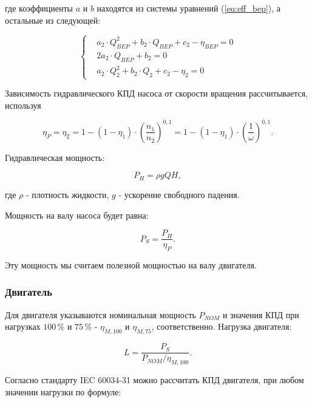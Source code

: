 \documentclass[a4paper, 12pt]{article}
\begin{document}
\noindent где коэффициенты \(a\) и \(b\) находятся из системы уравнений (\ref{eq:eff_bep}), а
остальные из следующей:

\begin{equation}
    \left\{
    \begin{aligned}
            &a_2 \cdot Q^2_{BEP} + b_2 \cdot Q_{BEP} + c_2 - \eta_{BEP} = 0 \\
            &2a_2 \cdot Q_{BEP} + b_2 = 0 \\
            &a_2 \cdot Q^2_2 + b_2 \cdot Q_2 + c_2 - \eta_2 = 0
	\end{aligned}
    \right.
\end{equation}

\noindent Зависимость гидравлического КПД насоса от скорости вращения рассчитывается, используя \cite{Sárbu}

\begin{equation}
	\eta_P = \eta_2 = 1 - (1 - \eta_1) \cdot \left(\frac{n_1}{n_2}\right)^{0,1} = 1 - (1 - \eta_1) \cdot \left(\frac{1}{\omega}\right)^{0,1}.
\end{equation}

    Гидравлическая мощность:

\begin{equation}
	P_H = \rho gQH,
\end{equation}

\noindent где $\rho$ - плотность жидкости, $g$ - ускорение свободного падения.

Мощность на валу насоса будет равна:

\begin{equation}
	P_S = \frac{P_H}{\eta_P}.
\end{equation}

\noindent Эту мощность мы считаем полезной мощностью на валу двигателя.

\subsubsection{Двигатель}

Для двигателя указываются номинальная мощность \(P_{NOM}\) и значения КПД при нагрузках \(100\,\%\) и \(75\,\%\) - \(\eta_{M,100}\) и \(\eta_{M,75}\), соответственно. Нагрузка двигателя:

\begin{equation}
	L = \frac{P_S}{P_{NOM} / \eta_{M,100}}.
\end{equation}

\noindent Согласно стандарту IEC 60034-31 \cite{IEC} можно рассчитать КПД двигателя, при
любом значении нагрузки по формуле:
\end{document}
